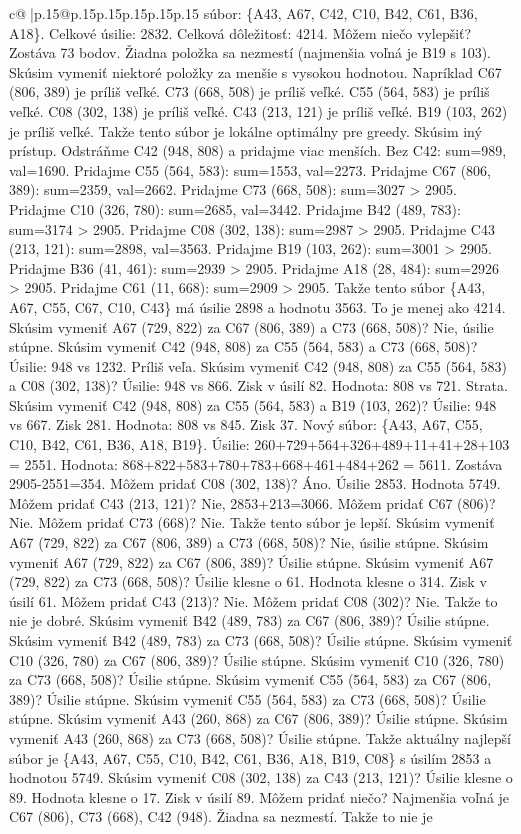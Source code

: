 \documentclass{article}
\begin{document}
{\begin{supertabular}{c@{$\;$}|p{.15\linewidth}@{}p{.15\linewidth}p{.15\linewidth}p{.15\linewidth}p{.15\linewidth}p{.15\linewidth}}
{{{súbor: \{A43, A67, C42, C10, B42, C61, B36, A18\}. Celkové úsilie: 2832. Celková dôležitosť: 4214. Môžem niečo vylepšiť? Zostáva 73 bodov. Žiadna položka sa nezmestí (najmenšia voľná je B19 s 103). Skúsim vymeniť niektoré položky za menšie s vysokou hodnotou. Napríklad C67 (806, 389) je príliš veľké. C73 (668, 508) je príliš veľké. C55 (564, 583) je príliš veľké. C08 (302, 138) je príliš veľké. C43 (213, 121) je príliš veľké. B19 (103, 262) je príliš veľké. Takže tento súbor je lokálne optimálny pre greedy. Skúsim iný prístup. Odstráňme C42 (948, 808) a pridajme viac menších. Bez C42: sum=989, val=1690. Pridajme C55 (564, 583): sum=1553, val=2273. Pridajme C67 (806, 389): sum=2359, val=2662. Pridajme C73 (668, 508): sum=3027 > 2905. Pridajme C10 (326, 780): sum=2685, val=3442. Pridajme B42 (489, 783): sum=3174 > 2905. Pridajme C08 (302, 138): sum=2987 > 2905. Pridajme C43 (213, 121): sum=2898, val=3563. Pridajme B19 (103, 262): sum=3001 > 2905. Pridajme B36 (41, 461): sum=2939 > 2905. Pridajme A18 (28, 484): sum=2926 > 2905. Pridajme C61 (11, 668): sum=2909 > 2905. Takže tento súbor \{A43, A67, C55, C67, C10, C43\} má úsilie 2898 a hodnotu 3563. To je menej ako 4214. Skúsim vymeniť A67 (729, 822) za C67 (806, 389) a C73 (668, 508)? Nie, úsilie stúpne. Skúsim vymeniť C42 (948, 808) za C55 (564, 583) a C73 (668, 508)? Úsilie: 948 vs 1232. Príliš veľa. Skúsim vymeniť C42 (948, 808) za C55 (564, 583) a C08 (302, 138)? Úsilie: 948 vs 866. Zisk v úsilí 82. Hodnota: 808 vs 721. Strata. Skúsim vymeniť C42 (948, 808) za C55 (564, 583) a B19 (103, 262)? Úsilie: 948 vs 667. Zisk 281. Hodnota: 808 vs 845. Zisk 37. Nový súbor: \{A43, A67, C55, C10, B42, C61, B36, A18, B19\}. Úsilie: 260+729+564+326+489+11+41+28+103 = 2551. Hodnota: 868+822+583+780+783+668+461+484+262 = 5611. Zostáva 2905{-}2551=354. Môžem pridať C08 (302, 138)? Áno. Úsilie 2853. Hodnota 5749. Môžem pridať C43 (213, 121)? Nie, 2853+213=3066. Môžem pridať C67 (806)? Nie. Môžem pridať C73 (668)? Nie. Takže tento súbor je lepší. Skúsim vymeniť A67 (729, 822) za C67 (806, 389) a C73 (668, 508)? Nie, úsilie stúpne. Skúsim vymeniť A67 (729, 822) za C67 (806, 389)? Úsilie stúpne. Skúsim vymeniť A67 (729, 822) za C73 (668, 508)? Úsilie klesne o 61. Hodnota klesne o 314. Zisk v úsilí 61. Môžem pridať C43 (213)? Nie. Môžem pridať C08 (302)? Nie. Takže to nie je dobré. Skúsim vymeniť B42 (489, 783) za C67 (806, 389)? Úsilie stúpne. Skúsim vymeniť B42 (489, 783) za C73 (668, 508)? Úsilie stúpne. Skúsim vymeniť C10 (326, 780) za C67 (806, 389)? Úsilie stúpne. Skúsim vymeniť C10 (326, 780) za C73 (668, 508)? Úsilie stúpne. Skúsim vymeniť C55 (564, 583) za C67 (806, 389)? Úsilie stúpne. Skúsim vymeniť C55 (564, 583) za C73 (668, 508)? Úsilie stúpne. Skúsim vymeniť A43 (260, 868) za C67 (806, 389)? Úsilie stúpne. Skúsim vymeniť A43 (260, 868) za C73 (668, 508)? Úsilie stúpne. Takže aktuálny najlepší súbor je \{A43, A67, C55, C10, B42, C61, B36, A18, B19, C08\} s úsilím 2853 a hodnotou 5749. Skúsim vymeniť C08 (302, 138) za C43 (213, 121)? Úsilie klesne o 89. Hodnota klesne o 17. Zisk v úsilí 89. Môžem pridať niečo? Najmenšia voľná je C67 (806), C73 (668), C42 (948). Žiadna sa nezmestí. Takže to nie je }}}
\end{supertabular}}
\end{document}
